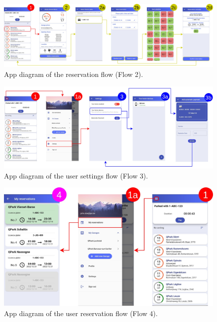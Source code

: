 \begin{figure}[hpt]
    \centering
    \includegraphics[width=14cm]{images/app/app_diagrams/app_diagram-reservation.jpg}
    \caption{App diagram of the reservation flow (Flow 2).}
    \label{fig:reservation-flow}
\end{figure}
\begin{figure}[hpt]
    \centering
    \includegraphics[width=14cm]{images/app/app_diagrams/app_diagram-user-settings-flow.jpg}
    \caption{App diagram of the user settings flow (Flow 3).}
    \label{fig:user-settings-flow}
\end{figure}
\begin{figure}[!hpt]
    \centering
    \includegraphics[width=14cm]{images/app/app_diagrams/app_diagram-user-reservation-flow.jpg}
    \caption{App diagram of the user reservation flow (Flow 4).}
    \label{fig:user-reservation-flow}
\end{figure}

